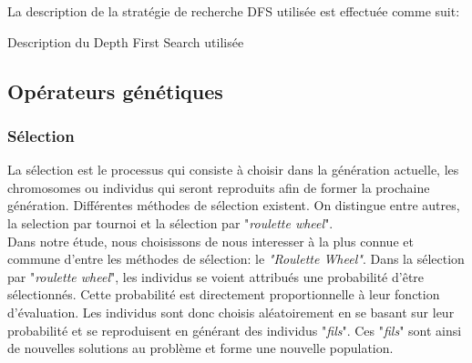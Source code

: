 \documentclass[12pt,a4paper]{article}
\begin{document}
	\vspace*{.5cm}
	La description de la stratégie de recherche DFS utilisée est effectuée comme suit: \\
	
	\begin{algorithm}[H]
		\caption{Description du Depth First Search utilisée}
 		\BlankLine
		\BlankLine 		
	\end{algorithm}	
	
	\subsection{Opérateurs génétiques}
		\subsubsection{Sélection}
		La sélection est le processus qui consiste à choisir dans la génération actuelle, les chromosomes ou individus qui seront reproduits afin de former la prochaine génération. Différentes méthodes de sélection existent. On distingue entre autres, la selection par tournoi et la sélection par "\emph{roulette wheel}". \\
		\hspace*{.5cm} Dans notre étude, nous choisissons de nous interesser à la plus connue et commune d'entre les méthodes de sélection: le \emph{"Roulette Wheel"}. Dans la sélection par "\emph{roulette wheel}", les individus se voient attribués une probabilité d'être sélectionnés. Cette probabilité est directement proportionnelle à leur fonction d'évaluation. Les individus sont donc choisis aléatoirement en se basant sur leur probabilité et se reproduisent en générant des individus "\emph{fils}". Ces "\emph{fils}" sont ainsi de nouvelles solutions au problème et forme une nouvelle population.
\end{document}
